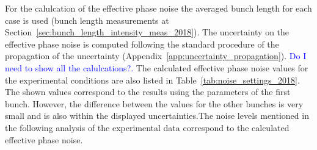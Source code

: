 For the calulcation of the effective phase noise the averaged bunch length for each case is used (bunch length measurements at Section~\ref{sec:bunch_length_intensity_meas_2018}). The uncertainty on the effective phase noise is computed following the standard procedure of the propagation of the uncertainty (Appendix~\ref{app:uncertainty_propagation}). \textcolor{blue}{Do I need to show all the calulcations?.} The calculated effective phase noise values for the experimental conditions are also listed in Table~\ref{tab:noise_settings_2018}. The shown values correspond to the results using the parameters of the first bunch. However, the difference between the values for the other bunches is very small and is also within the displayed uncertainties.The noise levels mentioned in the following analysis of the experimental data correspond to the calculated effective phase noise. 

